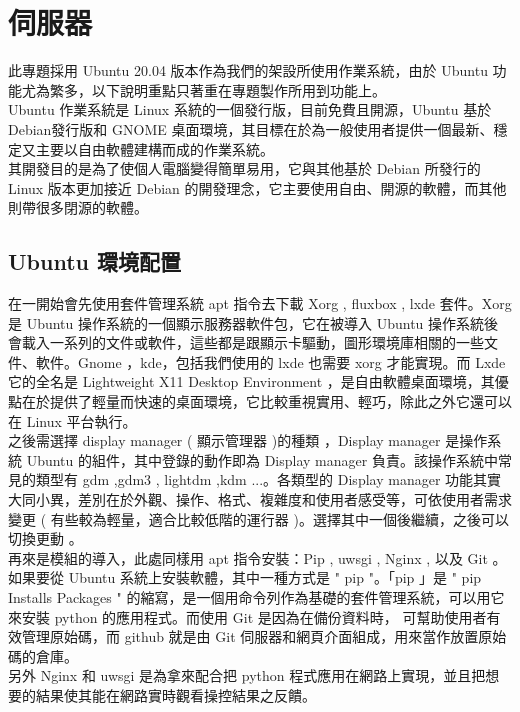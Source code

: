 \documentclass[14pt,a4paper]{report}  %
\begin{document}
\begin{enumerate}

\end{enumerate}

\newpage
\chapter{伺服器}
 此專題採用 Ubuntu 20.04 版本作為我們的架設所使用作業系統，由於 Ubuntu 功能尤為繁多，以下說明重點只著重在專題製作所用到功能上。\\
 Ubuntu 作業系統是 Linux 系統的一個發行版，目前免費且開源，Ubuntu 基於 Debian發行版和 GNOME 桌面環境，其目標在於為一般使用者提供一個最新、穩定又主要以自由軟體建構而成的作業系統。\\
 其開發目的是為了使個人電腦變得簡單易用，它與其他基於 Debian 所發行的 Linux 版本更加接近 Debian 的開發理念，它主要使用自由、開源的軟體，而其他則帶很多閉源的軟體。\\
\section{Ubuntu 環境配置}
 在一開始會先使用套件管理系統 apt 指令去下載 Xorg , fluxbox , lxde 套件。Xorg 是 Ubuntu 操作系統的一個顯示服務器軟件包，它在被導入 Ubuntu 操作系統後會載入一系列的文件或軟件，這些都是跟顯示卡驅動，圖形環境庫相關的一些文件、軟件。Gnome ，kde，包括我們使用的 lxde 也需要 xorg 才能實現。而 Lxde 它的全名是 Lightweight X11 Desktop Environment ，是自由軟體桌面環境，其優點在於提供了輕量而快速的桌面環境，它比較重視實用、輕巧，除此之外它還可以在 Linux 平台執行。\\
 之後需選擇 display manager ( 顯示管理器 )的種類 ，Display manager 是操作系統 Ubuntu 的組件，其中登錄的動作即為 Display manager 負責。該操作系統中常見的類型有 gdm ,gdm3 , lightdm ,kdm ...。各類型的 Display manager 功能其實大同小異，差別在於外觀、操作、格式、複雜度和使用者感受等，可依使用者需求變更 ( 有些較為輕量，適合比較低階的運行器 )。選擇其中一個後繼續，之後可以切換更動 。\\
 再來是模組的導入，此處同樣用 apt 指令安裝：Pip , uwsgi , Nginx  , 以及 Git 。如果要從 Ubuntu 系統上安裝軟體，其中一種方式是 " pip "。「pip 」是 " pip Installs Packages " 的縮寫，是一個用命令列作為基礎的套件管理系統，可以用它來安裝 python 的應用程式。而使用 Git 是因為在備份資料時， 可幫助使用者有效管理原始碼，而 github 就是由 Git 伺服器和網頁介面組成，用來當作放置原始碼的倉庫。\\
 另外 Nginx 和 uwsgi 是為拿來配合把 python 程式應用在網路上實現，並且把想要的結果使其能在網路實時觀看操控結果之反饋。\\
\end{document}

